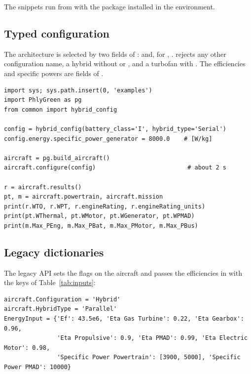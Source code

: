 \documentclass[a4paper,11pt]{article}
\begin{document}
The snippets run from  with the package installed in the 
environment.

\subsection{Typed configuration}
The architecture is selected by two fields of :
 and, for , .
 rejects any other configuration name, a hybrid without
 or , and a turbofan with . The
efficiencies and specific powers are fields of .
\begin{lstlisting}
import sys; sys.path.insert(0, 'examples')
import PhlyGreen as pg
from common import hybrid_config

config = hybrid_config(battery_class='I', hybrid_type='Serial')
config.energy.specific_power_generator = 8000.0    # [W/kg]

aircraft = pg.build_aircraft()
aircraft.configure(config)                          # about 2 s

r = aircraft.results()
pt, m = aircraft.powertrain, aircraft.mission
print(r.WTO, r.WPT, r.engineRating, r.engineRating_units)
print(pt.WThermal, pt.WMotor, pt.WGenerator, pt.WPMAD)
print(m.Max_PEng, m.Max_PBat, m.Max_PMotor, m.Max_PBus)
\end{lstlisting}

\subsection{Legacy dictionaries}
The legacy API sets the flags on the aircraft and passes the efficiencies in
 with the keys of Table~\ref{tab:inputs}:
\begin{lstlisting}
aircraft.Configuration = 'Hybrid'
aircraft.HybridType = 'Parallel'
EnergyInput = {'Ef': 43.5e6, 'Eta Gas Turbine': 0.22, 'Eta Gearbox': 0.96,
               'Eta Propulsive': 0.9, 'Eta PMAD': 0.99, 'Eta Electric Motor': 0.98,
               'Specific Power Powertrain': [3900, 5000], 'Specific Power PMAD': 10000}
\end{lstlisting}
\end{document}
